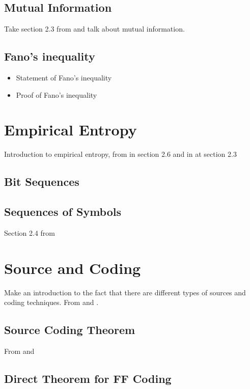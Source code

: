 \clearpage
\subsection{Mutual Information}
Take section 2.3 from \cite{han2002mathematics} and talk about mutual information.

\subsection{Fano's inequality}
\begin{itemize}
    \item Statement of Fano's inequality \cite{ElementsofInformationTheory}
    \item Proof of Fano's inequality \cite{ElementsofInformationTheory}
\end{itemize}

\clearpage
\section{Empirical Entropy}
Introduction to empirical entropy, from \cite{han2002mathematics} in section 2.6 and in \cite{navarro2016compact} at section 2.3
\subsection{Bit Sequences}
\subsection{Sequences of Symbols}

Section 2.4 from \cite{navarro2016compact}

\section{Source and Coding}
Make an introduction to the fact that there are different types of sources and coding techniques. From \cite{han2002mathematics} and \cite{ElementsofInformationTheory}.

\subsection{Source Coding Theorem}
From \cite{Shannon1948} and \cite{han2002mathematics}

\subsection{Direct Theorem for FF Coding}


